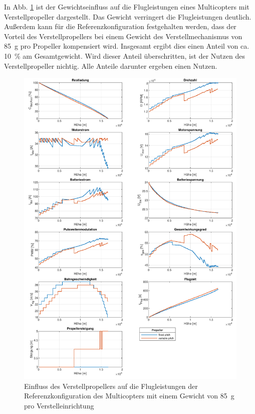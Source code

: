 \begin{appendix}
In Abb. \ref{abb:verstellprop_real} ist der Gewichtseinfluss auf die Flugleistungen eines Multicopters mit Verstellpropeller dargestellt. Das Gewicht verringert die Flugleistungen deutlich. Außerdem kann für die Referenzkonfiguration festgehalten werden, dass der Vorteil des Verstellpropellers bei einem Gewicht des Verstellmechanismus von \SI{85}{g} pro Propeller kompensiert wird. Insgesamt ergibt dies einen Anteil von ca. \SI{10}{\%} am Gesamtgewicht. Wird dieser Anteil überschritten, ist der Nutzen des Verstellpropeller nichtig. Alle Anteile darunter ergeben einen Nutzen. 
\begin{figure}[H]
\centering
	\includegraphics[scale=0.7]{Diagramme/Verstellprop_real.pdf}
	\caption{Einfluss des Verstellpropellers auf die Flugleistungen der Referenzkonfiguration des Multicopters mit einem Gewicht von \SI{85}{g} pro Verstelleinrichtung}
	\label{abb:verstellprop_real}
\end{figure}



\end{appendix}
